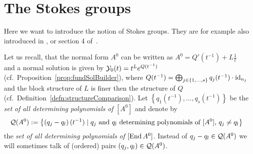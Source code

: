 \begin{comment}
      \textbf{``\Leftarrow{}'':}
      If for some suitable covering $(I_j)$ the cocycle $(\lambda_{jl})$ is a
      coboundary with values in $\Aut_\cA(\tilde\cM^{nf})$, i.e.\
      $\lambda_{jl}=f_lf_j^{-1}$, we define a new connection $\nabla$ on
      $\tilde\cM^{nf}$ by conjugating $\nabla^{nf}$ by $f_j$ on $U_j$.

      \TODO{}

      Moreover $\hat f_j=\hat f_l$ on $U_j\cap U_l$, so that the formal
      isomorphisms
      \[
        \hat f_j:(\hat \cM^{nf},\nabla)
        \overset{\sim}{\longrightarrow}
        (\hat\cM^{nf},\nabla^{nf})
      \]
      can be glued in an isomorphism $\hat f:(\hat \cM^{nf},\nabla)
      \overset{\sim}{\longrightarrow}(\hat\cM^{nf},\nabla^{nf})$.
    \end{proof}

    Thus, the proof of Theorem~\ref{thm:mainThm1} is a consequence of the
    following Theorem by Malgrange and Sibuya.
    \begin{thm}[Malgrange-Sibuya]\label{thm:malgSibuyaHelp}
      \marginnote{\cite[Thm.II.6.10]{sabbah2007isomonodromic}}
      The image of the mapping
      \[
        H^1(S^1;\Gl_d^{<0}(\cA_{\tilde D}))
        \to
        H^1(S^1;\Gl_d(\cA_{\tilde D}))
      \]
      is the identity.
    \end{thm}
    For the proof of Theorem~\ref{thm:malgSibuyaHelp} which we refer to
    \cite[Th.A.1]{Malgrange1983}, \cite[Th.6.4.1]{sibuya1990Linear} and
    \cite{babbitt1989local}.
  \end{proof}
\end{comment}
\fi

\section{The Stokes groups}\label{sec:StokesGroup}
\PROBLEM[rewrite!]
Here we want to introduce the notion of Stokes groups. They are for example
also introduced in \cite{Loday1994}, \cite{Loday2014} or section 4
of~\cite{Martinet1991}.

Let us recall, that the normal form $A^0$ can be written as
$A^0=Q'(t^{-1})+L\frac{1}{t}$ and a normal solution is given by
$\mathcal{Y}_0(t)=t^Le^{Q(t^{-1})}$ (cf.\ Proposition~\ref{prop:fundSolBuilder}), where
$Q(t^{-1})=\bigoplus_{j\in\{1,\dots,s\}}q_j(t^{-1})\cdot\operatorname{id}_{n_j}$ and the
block structure of $L$ is finer then the structure of $Q$
(cf.\ Definition~\ref{defn:structureComparison}).
Let $\left\{q_1(t^{-1}),\dots,q_s(t^{-1})\right\}$ be the \emph{set of all
determining polynomials of $[A^0]$} and denote by
\[
  \mathcal{Q}(A^0):=\left\{\left(q_j-q_l\right)(t^{-1})
    \mid
    \text{$q_j$ and $q_l$ determining polynomials of $[A^0]$, }
    q_j \neq q_l
  \right\}
\]
the \emph{set of all determining polynomials of $[\operatorname{End} A^0]$}.
Instead of $q_j-q_l\in\mathcal{Q}(A^0)$ we will sometimes talk of (ordered) pairs
$(q_j,q_l)\in\mathcal{Q}(A^0)$.

